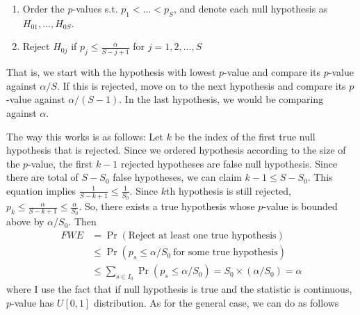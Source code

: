 \documentclass[12pt]{article}
\theoremstyle{definition}
\theoremstyle{property}
\theoremstyle{assumption}
\theoremstyle{example}
\theoremstyle{comment}
\begin{document}
\begin{enumerate}
\item Order the $p$-values s.t. $p_1<...<p_S$, and denote each null hypothesis as $H_{01},...,H_{0S}$. 
\item Reject $H_{0j}$ if $p_j \leq \frac{\alpha}{S-j+1}$ for $j=1,2,...,S$
\end{enumerate}
That is, we start with the hypothesis with lowest $p$-value and compare its $p$-value against $\alpha/S$. If this is rejected, move on to the next hypothesis and compare its $p$-value against $\alpha/(S-1)$. In the last hypothesis, we would be comparing against $\alpha$. \par
The way this works is as follows: Let $k$ be the index of the first true null hypothesis that is rejected. Since we ordered hypothesis according to the size of the $p$-value, the first $k-1$ rejected hypotheses are false null hypothesis. Since there are total of $S-S_0$ false hypotheses, we can claim $k-1\leq S-S_0$. This equation implies $\frac{1}{S-k+1}\leq\frac{1}{S_0}$. Since $k$th hypothesis is still rejected, $p_k\leq\frac{\alpha}{S-k+1}\leq \frac{\alpha}{S_0}$. So, there exists a true hypothesis whose $p$-value is bounded above by $\alpha/S_0$.  Then
\begin{align*}
FWE&=\Pr(\text{Reject at least one true hypothesis})\\
&\leq \Pr(p_s\leq \alpha/S_0\ \text{for some true hypothesis})\\
&\leq \sum_{s\in I_0}\Pr(p_s\leq \alpha/S_0) = S_0\times (\alpha/S_0)=\alpha
\end{align*}
where I use the fact that if null hypothesis is true and the statistic is continuous, $p$-value has $U[0,1]$ distribution. As for the general case, we can do as follows
\end{document}

